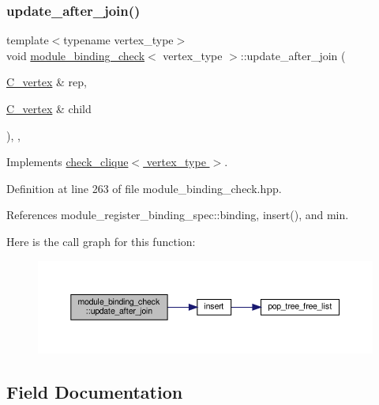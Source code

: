 \subsubsection{\texorpdfstring{update\+\_\+after\+\_\+join()}{update\_after\_join()}}
{\footnotesize\ttfamily template$<$typename vertex\+\_\+type$>$ \\
void \hyperlink{structmodule__binding__check}{module\+\_\+binding\+\_\+check}$<$ vertex\+\_\+type $>$\+::update\+\_\+after\+\_\+join (\begin{DoxyParamCaption}\item[{\hyperlink{clique__covering__graph_8hpp_a9cb45047ea8c5ed95a8cfa90494345aa}{C\+\_\+vertex} \&}]{rep,  }\item[{\hyperlink{clique__covering__graph_8hpp_a9cb45047ea8c5ed95a8cfa90494345aa}{C\+\_\+vertex} \&}]{child }\end{DoxyParamCaption})\hspace{0.3cm}{\ttfamily [inline]}, {\ttfamily [override]}, {\ttfamily [virtual]}}



Implements \hyperlink{structcheck__clique_a9b4bfcf91eab9a68e1b75371ce372515}{check\+\_\+clique$<$ vertex\+\_\+type $>$}.



Definition at line 263 of file module\+\_\+binding\+\_\+check.\+hpp.



References module\+\_\+register\+\_\+binding\+\_\+spec\+::binding, insert(), and min.

Here is the call graph for this function\+:
\nopagebreak
\begin{figure}[H]
\begin{center}
\leavevmode
\includegraphics[width=350pt]{d1/dc5/structmodule__binding__check_ae76cbfa7bdfffd10adf7033c67224798_cgraph}
\end{center}
\end{figure}


\subsection{Field Documentation}
\mbox{\label{structmodule__binding__check_a29a221e7901b9427dd37b8e213b19660}} 
